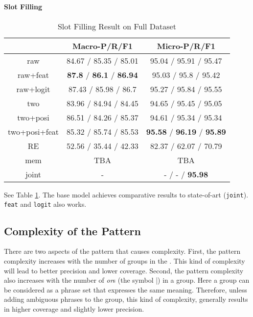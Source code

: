\paragraph{Slot Filling}
\begin{table}
\setlength{\tabcolsep}{0.23em}
\centering
\small{
\begin{tabular}{|c|c|c|}

\hline
  & Macro-P/R/F1 & Micro-P/R/F1  \\
\hline
raw &  84.67 / 85.35 / 85.01            & 95.04 / 95.91 / 95.47  \\
\hline
raw+feat & \textbf{87.8} / \textbf{86.1} / \textbf{86.94} & 95.03 / 95.8 / 95.42  \\
\hline
raw+logit & 87.43 / 85.98 / 86.7        & 95.27 / 95.84 / 95.55  \\
\hline
two & 83.96 / 84.94 / 84.45             & 94.65 / 95.45 / 95.05 \\
\hline
two+posi & 86.51 / 84.26 / 85.37        & 94.61 / 95.34 / 95.34  \\
\hline
two+posi+feat & 85.32 / 85.74 / 85.53   & \textbf{95.58} / \textbf{96.19} / \textbf{95.89} \\
\hline
\hline
RE & 52.56 / 35.44 / 42.33 & 82.37 / 62.07 / 70.79 \\
\hline
mem & TBA & TBA \\
\hline
joint & - & - / - / \textbf{95.98} \\
\hline 

\end{tabular}
}
\caption{Slot Filling Result on Full Dataset}
\label{tab_slot_full}
\end{table}

See Table \ref{tab_slot_full}. The base model achieves comparative results to state-of-art (\texttt{joint}).
\texttt{feat} and \texttt{logit} also works. 


\subsection{Complexity of the Pattern}
There are two aspects of the pattern that causes complexity. First, the pattern complexity increases with the number of groups in the \RE. This kind of complexity will lead to better precision and lower coverage. Second, the pattern complexity also increases with the number of \emph{or}s (the symbol |) in a group. Here a group can be considered as a phrase set that expresses the same meaning. Therefore, unless adding ambiguous phrases to the group, this kind of complexity, generally results in higher coverage and slightly lower precision. 

